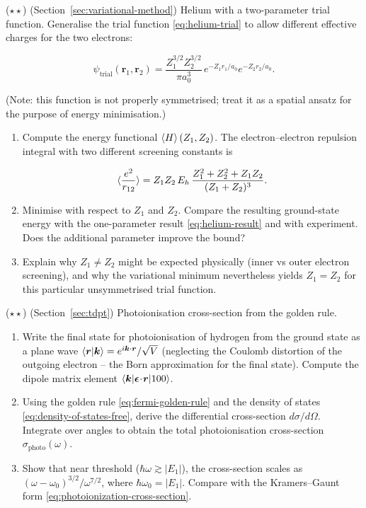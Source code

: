 \begin{problemset}
\item ($\star\star$) (Section~\ref{sec:variational-method}) Helium with a two-parameter trial function. Generalise the trial function \eqref{eq:helium-trial} to allow different effective charges for the two electrons:
\begin{linenomath}
\begin{equation*}
\psi_{\text{trial}}(\bm r_{1},\bm r_{2}) = \frac{Z_{1}^{3/2}Z_{2}^{3/2}}{\pi a_{0}^{3}}\,
e^{-Z_{1}r_{1}/a_{0}}e^{-Z_{2}r_{2}/a_{0}}.
\end{equation*}
\end{linenomath}
(Note: this function is not properly symmetrised; treat it as a spatial ansatz for the purpose of energy minimisation.)
\begin{enumerate}
\item[(a)] Compute the energy functional $\braket{H}(Z_{1},Z_{2})$. The electron--electron repulsion integral with two different screening constants is
\begin{linenomath}
\begin{equation*}
\braket{\frac{e^{2}}{r_{12}}} = Z_{1}Z_{2}\,E_{h}\,
\frac{Z_{1}^{2}+Z_{2}^{2}+Z_{1}Z_{2}}{(Z_{1}+Z_{2})^{3}}.
\end{equation*}
\end{linenomath}
\item[(b)] Minimise with respect to $Z_{1}$ and $Z_{2}$. Compare the resulting ground-state energy with the one-parameter result \eqref{eq:helium-result} and with experiment. Does the additional parameter improve the bound?
\item[(c)] Explain why $Z_{1} \neq Z_{2}$ might be expected physically (inner vs outer electron screening), and why the variational minimum nevertheless yields $Z_{1}=Z_{2}$ for this particular unsymmetrised trial function.
\end{enumerate}

\item ($\star\star$) (Section~\ref{sec:tdpt}) Photoionisation cross-section from the golden rule.
\begin{enumerate}
\item[(a)] Write the final state for photoionisation of hydrogen from the ground state as a plane wave $\braket{\bm r|\bm k} = e^{i\bm k\cdot\bm r}/\sqrt{V}$ (neglecting the Coulomb distortion of the outgoing electron -- the Born approximation for the final state). Compute the dipole matrix element $\braket{\bm k|\bm\epsilon\!\cdot\!\bm r|100}$.
\item[(b)] Using the golden rule \eqref{eq:fermi-golden-rule} and the density of states \eqref{eq:density-of-states-free}, derive the differential cross-section $d\sigma/d\Omega$. Integrate over angles to obtain the total photoionisation cross-section $\sigma_{\text{photo}}(\omega)$.
\item[(c)] Show that near threshold ($\hbar\omega \gtrsim |E_{1}|$), the cross-section scales as $(\omega-\omega_{0})^{3/2}/\omega^{7/2}$, where $\hbar\omega_{0} = |E_{1}|$. Compare with the Kramers--Gaunt form \eqref{eq:photoionization-cross-section}.
\end{enumerate}


\end{problemset}
